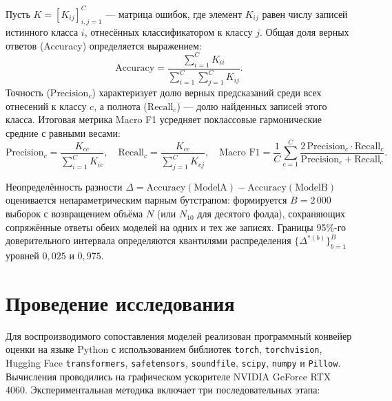 \documentclass[pdflatex,sn-mathphys-num]{sn-jnl}
\begin{document}
Пусть $K = [K_{ij}]_{i,j=1}^{C}$ --- матрица ошибок, где элемент $K_{ij}$ равен числу записей истинного класса $i$, отнесённых классификатором к классу $j$. Общая доля верных ответов (Accuracy) определяется выражением:
\begin{equation}\label{eq:acc}
    \text{Accuracy} = \frac{\sum_{i=1}^{C} K_{ii}}{\sum_{i=1}^{C}\sum_{j=1}^{C} K_{ij}}.
\end{equation}
Точность ($\text{Precision}_c$) характеризует долю верных предсказаний среди всех отнесений к классу $c$, а полнота ($\text{Recall}_c$) --- долю найденных записей этого класса. Итоговая метрика Macro F1 усредняет поклассовые гармонические средние с равными весами:
\begin{equation}\label{eq:macrof1}
    \text{Precision}_c = \frac{K_{cc}}{\sum_{i=1}^{C} K_{ic}}, \quad
    \text{Recall}_c = \frac{K_{cc}}{\sum_{j=1}^{C} K_{cj}}, \quad
    \text{Macro F1} = \frac{1}{C} \sum_{c=1}^{C} \frac{2\,\text{Precision}_c \cdot \text{Recall}_c}{\text{Precision}_c + \text{Recall}_c}.
\end{equation}

Неопределённость разности $\Delta = \text{Accuracy}(\text{ModelA}) - \text{Accuracy}(\text{ModelB})$ оценивается непараметрическим парным бутстрапом: формируется $B = 2\,000$ выборок с возвращением объёма $N$ (или $N_{10}$ для десятого фолда), сохраняющих сопряжённые ответы обеих моделей на одних и тех же записях. Границы 95\%-го доверительного интервала определяются квантилями распределения $\{\Delta^{*(b)}\}_{b=1}^{B}$ уровней $0{,}025$ и $0{,}975$.

\section{Проведение исследования}\label{sec:experiment}

Для воспроизводимого сопоставления моделей реализован программный конвейер оценки на языке Python с использованием библиотек \texttt{torch}, \texttt{torchvision}, Hugging Face \texttt{transformers}, \texttt{safetensors}, \texttt{soundfile}, \texttt{scipy}, \texttt{numpy} и \texttt{Pillow}. Вычисления проводились на графическом ускорителе NVIDIA GeForce RTX 4060. Экспериментальная методика включает три последовательных этапа:
\end{document}
